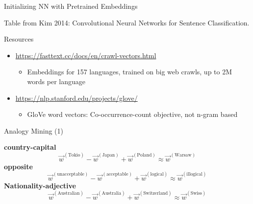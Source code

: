 \begin{vbframe}{Initializing NN with Pretrained Embeddings}

\vfill


Table from Kim 2014: Convolutional Neural Networks for Sentence Classification.

\vfill

\end{vbframe}


\begin{vbframe}{Resources}

\vfill

\begin{itemize}
	\item \url{https://fasttext.cc/docs/en/crawl-vectors.html}
		\begin{itemize}
			\item Embeddings for 157 languages, trained on big web crawls, up to 2M words per language
		\end{itemize}
	\item \url{https://nlp.stanford.edu/projects/glove/}
		\begin{itemize}
			\item GloVe word vectors: Co-occurrence-count objective, not n-gram based
		\end{itemize}
\end{itemize}

\vfill

\end{vbframe}


\begin{vbframe}{Analogy Mining (1)}

\vfill

\textbf{country-capital}
$$\vec w^{(\text{Tokio})} - \vec w^{(\text{Japan})} +  \vec w^{(\text{Poland})} \approx \vec w^{(\text{Warsaw})}$$
\textbf{opposite}
$$\vec w^{(\text{unacceptable})} - \vec w^{(\text{acceptable})} +  \vec w^{(\text{logical})} \approx \vec w^{(\text{illogical})}$$
\textbf{Nationality-adjective}
$$\vec w^{(\text{Australian})} - \vec w^{(\text{Australia})} +  \vec w^{(\text{Switzerland})} \approx \vec w^{(\text{Swiss})}$$

\vfill

\end{vbframe}

